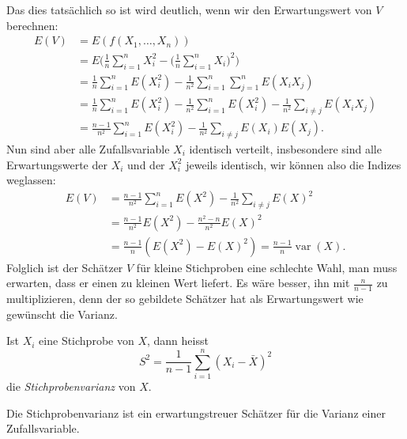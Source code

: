 Das dies tatsächlich so ist wird deutlich, wenn wir den
Erwartungswert von $V$ berechnen:
\begin{align*}
E(V)
&=
E(f(X_1,\dots,X_n))
\\
&=
E\biggl(
\frac1n\sum_{i=1}^nX_i^2-\biggl(\frac1n\sum_{i=1}^nX_i\biggr)^2
\biggr)
\\
&=
\frac1n\sum_{i=1}^nE(X_i^2)-\frac1{n^2}\sum_{i=1}^n\sum_{j=1}^n E(X_iX_j)
\\
&=
\frac1n\sum_{i=1}^nE(X_i^2)-
\frac1{n^2}\sum_{i=1}^nE(X_i^2)
-\frac1{n^2}\sum_{i\ne j} E(X_iX_j)
\\
&=
\frac{n-1}{n^2}\sum_{i=1}^nE(X_i^2)
-\frac1{n^2}\sum_{i\ne j} E(X_i)E(X_j).
\end{align*}
Nun sind aber alle Zufallsvariable $X_i$ identisch verteilt, insbesondere
sind alle Erwartungswerte der $X_i$ und der $X_i^2$ jeweils identisch,
wir können also die Indizes weglassen:
\begin{align*}
E(V)
&=
\frac{n-1}{n^2}\sum_{i=1}^nE(X^2) -\frac1{n^2}\sum_{i\ne j} E(X)^2
\\
&=
\frac{n-1}{n^2}E(X^2) -\frac{n^2-n}{n^2}E(X)^2
\\
&=
\frac{n-1}{n}(E(X^2) -E(X)^2)=\frac{n-1}n\operatorname{var}(X).
\end{align*}
Folglich ist der Schätzer $V$ für kleine Stichproben eine schlechte
Wahl, man muss erwarten, dass er einen zu kleinen Wert liefert.
Es
wäre besser, ihn mit $\frac{n}{n-1}$ zu multiplizieren, denn der so
gebildete Schätzer hat als Erwartungswert wie gewünscht die Varianz.

\begin{definition}
Ist $X_i$ eine Stichprobe von $X$, dann heisst
\begin{equation}
S^2=\frac1{n-1}\sum_{i=1}^n (X_i -\bar X)^2
\end{equation}
die {\em Stichprobenvarianz} von $X$.
\end{definition}

\begin{satz}Die Stichprobenvarianz ist ein erwartungstreuer Schätzer
für die Varianz einer Zufallsvariable.
\end{satz}

